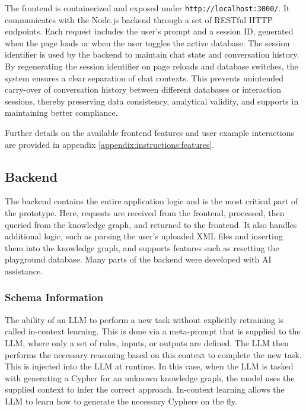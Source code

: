The frontend is containerized and exposed under \texttt{http://localhost:3000/}. It communicates with the Node.js backend through a set of RESTful HTTP endpoints. Each request includes the user’s prompt and a session ID, generated when the page loads or when the user toggles the active database. The session identifier is used by the backend to maintain chat state and conversation history. By regenerating the session identifier on page reloads and database switches, the system ensures a clear separation of chat contexts. This prevents unintended carry-over of conversation history between different databases or interaction sessions, thereby preserving data consistency, analytical validity, and supports in maintaining better compliance.

Further details on the available frontend features and user example interactions are provided in appendix \ref{appendix:instructions:features}.

\subsection{Backend}
\label{sub:backend}
The backend contains the entire application logic and is the most critical part of the prototype. Here, requests are received from the frontend, processed, then queried from the knowledge graph, and returned to the frontend. It also handles additional logic, such as parsing the user's uploaded XML files and inserting them into the knowledge graph, and supports features such as resetting the playground database. Many parts of the backend were developed with AI assistance. \cite{openai_chatgpt_2023}

\subsubsection{Schema Information}
\label{sub:schema}

The ability of an LLM to perform a new task without explicitly retraining is called in-context learning. \cite{xie2021explanation} This is done via a meta-prompt that is supplied to the LLM, where only a set of rules, inputs, or outputs are defined. The LLM then performs the necessary reasoning based on this context to complete the new task. This is injected into the LLM at runtime. \cite{xie2021explanation} In this case, when the LLM is tasked with generating a Cypher for an unknown knowledge graph, the model uses the supplied context to infer the correct approach. In-context learning allows the LLM to learn how to generate the necessary Cyphers on the fly. \cite{xie2021explanation, wan2025prompting}

